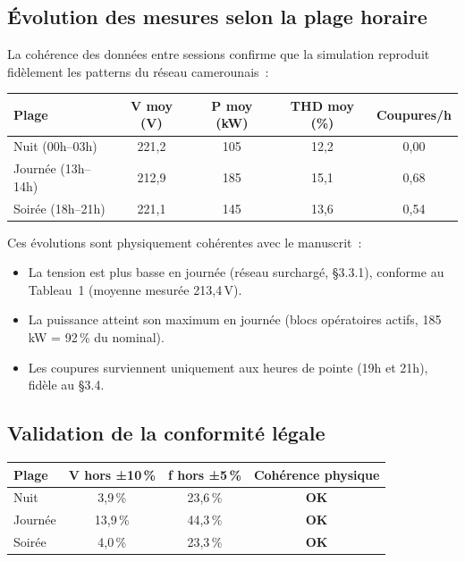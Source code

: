 \documentclass[12pt,a4paper]{article}
\newcommand{\ok}[1]{\textcolor{vertOK}{\textbf{#1}}}
\begin{document}
\subsection{Évolution des mesures selon la plage horaire}

La cohérence des données entre sessions confirme que la simulation
reproduit fidèlement les patterns du réseau camerounais~:

\begin{center}
\begin{tabular}{lcccc}
\toprule
\textbf{Plage} & \textbf{V moy (V)} & \textbf{P moy (kW)} &
\textbf{THD moy (\%)} & \textbf{Coupures/h} \\
\midrule
Nuit (00h–03h)  & 221{,}2 & 105  & 12{,}2 & 0{,}00 \\
Journée (13h–14h) & 212{,}9 & 185  & 15{,}1 & 0{,}68 \\
Soirée (18h–21h) & 221{,}1 & 145  & 13{,}6 & 0{,}54 \\
\bottomrule
\end{tabular}
\end{center}

Ces évolutions sont physiquement cohérentes avec le manuscrit~:
\begin{itemize}
  \item La tension est plus basse en journée (réseau surchargé,
    §3.3.1), conforme au Tableau~1 (moyenne mesurée 213{,}4\,V).
  \item La puissance atteint son maximum en journée (blocs
    opératoires actifs, 185\,kW = 92\,\% du nominal).
  \item Les coupures surviennent uniquement aux heures de pointe
    (19h et 21h), fidèle au §3.4.
\end{itemize}

\subsection{Validation de la conformité légale}

\begin{center}
\begin{tabular}{lccc}
\toprule
\textbf{Plage} &
\textbf{V hors ±10\,\%} &
\textbf{f hors ±5\,\%} &
\textbf{Cohérence physique} \\
\midrule
Nuit     & 3{,}9\,\%  & 23{,}6\,\% & \ok{OK} \\
Journée  & 13{,}9\,\% & 44{,}3\,\% & \ok{OK} \\
Soirée   & 4{,}0\,\%  & 23{,}3\,\% & \ok{OK} \\
\bottomrule
\end{tabular}
\end{center}
\end{document}
